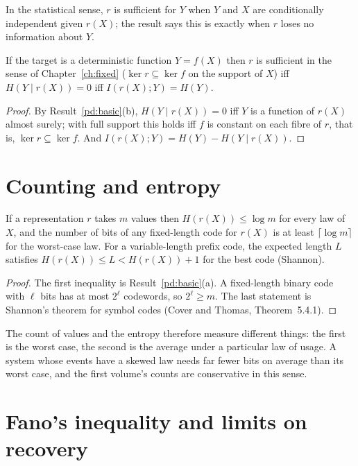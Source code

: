In the statistical sense, $r$ is sufficient for $Y$ when $Y$ and $X$ are conditionally independent given $r(X)$; the result says this is exactly when $r$ loses no information about $Y$.

\begin{newresult}\label{pd:det}
If the target is a deterministic function $Y=f(X)$ then $r$ is sufficient in the sense of Chapter~\ref{ch:fixed} ($\ker r\subseteq\ker f$ on the support of $X$) iff $H(Y\mid r(X))=0$ iff $I(r(X);Y)=H(Y)$.
\end{newresult}
\begin{proof}
By Result~\ref{pd:basic}(b), $H(Y\mid r(X))=0$ iff $Y$ is a function of $r(X)$ almost surely; with full support this holds iff $f$ is constant on each fibre of $r$, that is, $\ker r\subseteq\ker f$. And $I(r(X);Y)=H(Y)-H(Y\mid r(X))$.
\end{proof}

\section{Counting and entropy}

\begin{newresult}\label{pd:bits}
If a representation $r$ takes $m$ values then $H(r(X))\le\log m$ for every law of $X$, and the number of bits of any fixed-length code for $r(X)$ is at least $\lceil\log m\rceil$ for the worst-case law. For a variable-length prefix code, the expected length $L$ satisfies $H(r(X))\le L<H(r(X))+1$ for the best code (Shannon).
\end{newresult}
\begin{proof}
The first inequality is Result~\ref{pd:basic}(a). A fixed-length binary code with $\ell$ bits has at most $2^\ell$ codewords, so $2^\ell\ge m$. The last statement is Shannon's theorem for symbol codes (Cover and Thomas, Theorem~5.4.1).
\end{proof}

The count of values and the entropy therefore measure different things: the first is the worst case, the second is the average under a particular law of usage. A system whose events have a skewed law needs far fewer bits on average than its worst case, and the first volume's counts are conservative in this sense.

\section{Fano's inequality and limits on recovery}

